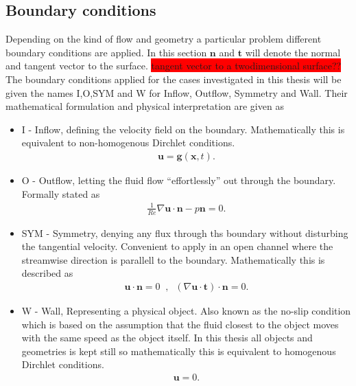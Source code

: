 \subsection{Boundary conditions}
Depending on the kind of flow and geometry a particular problem different boundary conditions are applied. In this section 
$\mathbf{n}$ and $\mathbf{t}$ will denote the normal and tangent vector to the surface.
\colorbox{red}{tangent vector to a twodimensional surface??}
The boundary conditions applied for the cases investigated in this thesis will be given the names 
I,O,SYM and W for Inflow, Outflow, Symmetry and Wall. Their mathematical formulation and physical interpretation are given as 
\begin{itemize}
    \item I 
        - Inflow, defining the velocity field on the boundary. Mathematically this is equivalent to 
        non-homogenous Dirchlet conditions. 
        \begin{align}
            \mathbf{u} = \mathbf{g}(\mathbf{x},t).
        \end{align}
    \item O 
        - Outflow, letting the fluid flow ``effortlessly'' out through the boundary. Formally stated as
        \begin{align}
            \frac{1}{Re} \nabla\mathbf{u}\cdot \mathbf{n}-p\mathbf{n}= 0.
        \end{align}
    \item SYM 
        - Symmetry, denying any flux through ths boundary without disturbing the tangential velocity. Convenient
        to apply in an open channel where the streamwise direction is parallell to the boundary. Mathematically this is 
        described as 
        \begin{align}
            \mathbf{u}\cdot \mathbf{n} = 0 \; \; , \; \; (\nabla\mathbf{u}\cdot \mathbf{t})\cdot \mathbf{n} = 0.
        \end{align}
    \item W 
        - Wall, Representing a physical object. Also known as the no-slip condition which is based on the assumption 
        that the fluid closest to the object moves with the same speed as the object itself. In this thesis all objects and 
        geometries is kept still so mathematically this is equivalent to 
        homogenous Dirchlet conditions. 
        \begin{align}
            \mathbf{u} = 0.
        \end{align}

\end{itemize}
%
